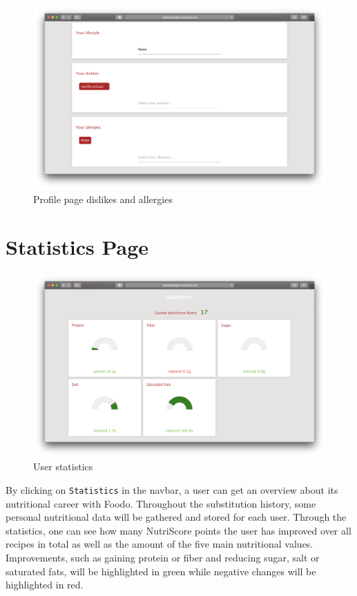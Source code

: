 \begin{figure}[H]
	\captionsetup{justification=centering}
	\begin{center}
		\includegraphics[scale=0.25]{Ressourcen/img/screenshots/screenshotP.png}
		\vspace{-2em}
		\caption{Profile page dislikes and allergies}
	\end{center}
\end{figure}

\section*{Statistics Page}
\vspace{-2em}
\begin{figure}[H]
	\captionsetup{justification=centering}
	\begin{center}
		\includegraphics[scale=0.30]{Ressourcen/img/screenshots/screenshotQ.png}
		\vspace{-3em}
		\caption{User statistics}
	\end{center}
\end{figure}
By clicking on \texttt{Statistics} in the navbar, a user can get an overview about its nutritional career with Foodo. Throughout the substitution history, some personal nutritional data will be gathered and stored for each user. Through the statistics, one can see how many NutriScore points the user has improved over all recipes in total as well as the amount of the five main nutritional values. Improvements, such as gaining protein or fiber and reducing sugar, salt or saturated fats, will be highlighted in green while negative changes will be highlighted in red.

